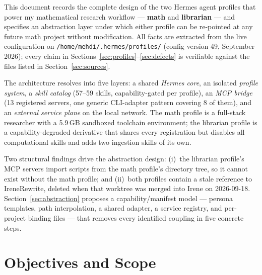 \documentclass[10pt]{article}
\title{\Title}
\author{\Author}
\date{\Date}
\newcommand{\mono}[1]{{\ttfamily\small #1}}
\begin{document}
\begin{titlepage}
\maketitle
\end{titlepage}

\linespread{1.2}

\begin{executive}

This document records the complete design of the two Hermes agent profiles that power my
mathematical research workflow --- \textbf{\mono{math}} and \textbf{\mono{librarian}} --- and
specifies an abstraction layer under which either profile can be re-pointed at any future math
project without modification. All facts are extracted from the live configuration on
\texttt{/home/mehdi/.hermes/profiles/} (config version 49, September 2026); every claim in
Sections~\ref{sec:profiles}--\ref{sec:defects} is verifiable against the files listed in
Section~\ref{sec:sources}.

The architecture resolves into five layers: a shared \emph{Hermes core}, an isolated
\emph{profile system}, a \emph{skill catalog} (57--59 skills, capability-gated per profile),
an \emph{MCP bridge} (13 registered servers, one generic CLI-adapter pattern covering 8 of them),
and an \emph{external service plane} on the local network. The math profile is a full-stack
researcher with a 5.9\,GB sandboxed toolchain environment; the librarian profile is a
capability-degraded derivative that shares every registration but disables all computational
skills and adds two ingestion skills of its own.

Two structural findings drive the abstraction design: (i)~the librarian profile's MCP servers
import scripts from the math profile's directory tree, so it cannot exist without the math
profile; and (ii)~both profiles contain a stale reference to \mono{IreneRewrite}, deleted when
that worktree was merged into \mono{Irene} on 2026-09-18. Section~\ref{sec:abstraction}
proposes a capability/manifest model --- persona templates, path interpolation, a shared adapter,
a service registry, and per-project binding files --- that removes every identified coupling in
five concrete steps.

\end{executive}

\tableofcontents
\newpage

\section{Objectives and Scope}\label{objectives}
\end{document}
